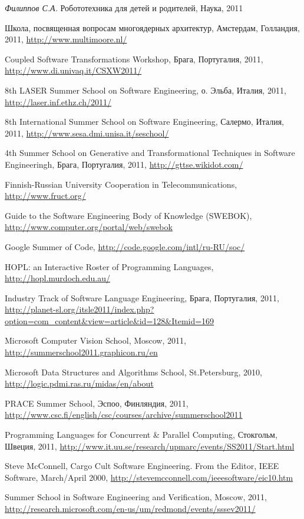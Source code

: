 \documentclass[a5paper]{article}
\begin{document}
\begin{thebibliography}{9001}
   \emph{Филиппов С.А.}
  Робототехника для детей и родителей, Наука, 2011

   Школа, посвященная вопросам многоядерных архитектур, Амстердам, Голландия, 2011, \url{http://www.multimoore.nl/}
  
   Coupled Software Transformations Workshop, Брага, Португалия, 2011, \url{http://www.di.univaq.it/CSXW2011/}
  
   8th LASER Summer School on Software Engineering, о. Эльба, Италия, 2011, \url{http://laser.inf.ethz.ch/2011/}
  
   8th International Summer School on Software Engineering, Салермо, Италия, 2011, \url{http://www.sesa.dmi.unisa.it/seschool/}
  
   4th Summer School on Generative and Transformational Techniques in Software Engineeringh, Брага, Португалия, 2011,  \url{http://gttse.wikidot.com/}
  
   Finnish-Russian University Cooperation in Telecommunications, \url{http://www.fruct.org/}
  
   Guide to the Software Engineering Body of Knowledge (SWEBOK), \url{http://www.computer.org/portal/web/swebok}
  
   Google Summer of Code, \url{http://code.google.com/intl/ru-RU/soc/}
  
   HOPL: an Interactive Roster of Programming Languages,  \url{http://hopl.murdoch.edu.au/}
  
   Industry Track of Software Language Engineering, Брага, Португалия, 2011, \url{http://planet-sl.org/itsle2011/index.php?option=com_content&view=article&id=128&Itemid=169}
  
   Microsoft Сomputer Vision School, Moscow, 2011, \url{http://summerschool2011.graphicon.ru/en}
  
   Microsoft Data Structures and Algorithms School, St.Petersburg, 2010, \url{http://logic.pdmi.ras.ru/midas/en/about}
  
   PRACE Summer School, Эспоо, Финляндия, 2011, \url{http://www.csc.fi/english/csc/courses/archive/summerschool2011}
  
   Programming Languages for Concurrent \& Parallel Computing, Стокгольм, Швеция, 2011, \url{http://www.it.uu.se/research/upmarc/events/SS2011/Start.html}
  
   Steve McConnell, Cargo Cult Software Engineering. From the Editor, IEEE Software, March/April 2000, \url{http://stevemcconnell.com/ieeesoftware/eic10.htm}
  
   Summer School in Software Engineering and Verification, Moscow, 2011, \url{http://research.microsoft.com/en-us/um/redmond/events/sssev2011/}

\end{thebibliography}
\end{document}
